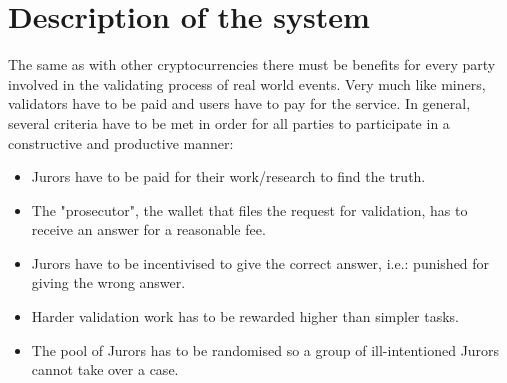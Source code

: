\documentclass{article}
\begin{document}
	\section{Description of the system}
		The same as with other cryptocurrencies there must be benefits for every party involved in the validating process of real world events. Very much like miners, validators have to be paid and users have to pay for the service. In general, several criteria have to be met in order for all parties to participate in a constructive and productive manner:
		\begin{itemize}
			\item Jurors have to be paid for their work/research to find the truth.
			\item The "prosecutor", the wallet that files the request for validation, has to receive an answer for a reasonable fee.
			\item Jurors have to be incentivised to give the correct answer, i.e.: punished for giving the wrong answer.
			\item Harder validation work has to be rewarded higher than simpler tasks.
			\item The pool of Jurors has to be randomised so a group of ill-intentioned Jurors cannot take over a case.
		\end{itemize}
		
	 
\end{document}
